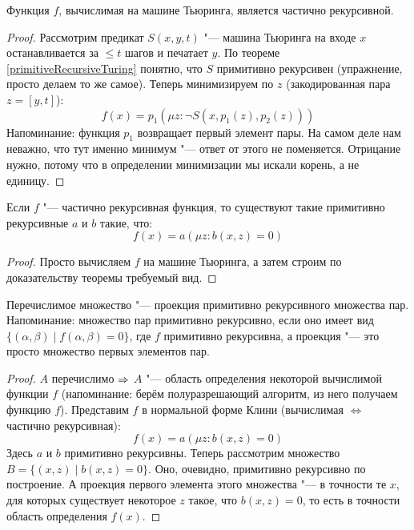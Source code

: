 \begin{theorem}
	Функция $f$, вычислимая на машине Тьюринга, является частично рекурсивной.
\end{theorem}
\begin{proof}
	Рассмотрим предикат $S(x, y, t)$ "--- машина Тьюринга на входе $x$ останавливается за $\le t$ шагов и печатает $y$.
	По теореме \ref{primitiveRecursiveTuring} понятно, что $S$ примитивно рекурсивен (упражнение, просто делаем то же самое).
	Теперь минимизируем по $z$ (закодированная пара $z=[y, t]$):
	\[ f(x) = p_1(\mu z \colon \lnot S(x, p_1(z), p_2(z))) \]
	Напоминание: функция $p_1$ возвращает первый элемент пары.
	На самом деле нам неважно, что тут именно минимум "--- ответ от этого не поменяется.
	Отрицание нужно, потому что в определении минимизации мы искали корень, а не единицу.
\end{proof}
\begin{conseq}
	Если $f$ "--- частично рекурсивная функция, то существуют такие примитивно рекурсивные $a$ и $b$ такие, что:
	\[ f(x) = a(\mu z \colon b(x, z) = 0) \]
\end{conseq}
\begin{proof}
	Просто вычисляем $f$ на машине Тьюринга, а затем строим по доказательству теоремы требуемый вид.
\end{proof}

\begin{assertion}
	Перечислимое множество "--- проекция примитивно рекурсивного множества пар.
	Напоминание: множество пар примитивно рекурсивно, если оно имеет вид $\{(\alpha, \beta) \mid f(\alpha, \beta)=0\}$, где $f$ примитивно рекурсивна,
	а проекция "--- это просто множество первых элементов пар.
\end{assertion}
\begin{proof}
	$A$ перечислимо $\Rightarrow$ $A$ "--- область определения некоторой вычислимой функции $f$
	(напоминание: берём полуразрешающий алгоритм, из него получаем функцию $f$).
	Представим $f$ в нормальной форме Клини (вычислимая $\iff$ частично рекурсивная):
	\[ f(x) = a(\mu z \colon b(x, z) = 0) \]
	Здесь $a$ и $b$ примитивно рекурсивны.
	Теперь рассмотрим множество $B=\{ (x,z) \mid b(x, z) = 0 \}$.
	Оно, очевидно, примитивно рекурсивно по построение.
	А проекция первого элемента этого множества "--- в точности те $x$, для которых существует некоторое $z$ такое, что $b(x, z)=0$,
	то есть в точности область определения $f(x)$.
\end{proof}
